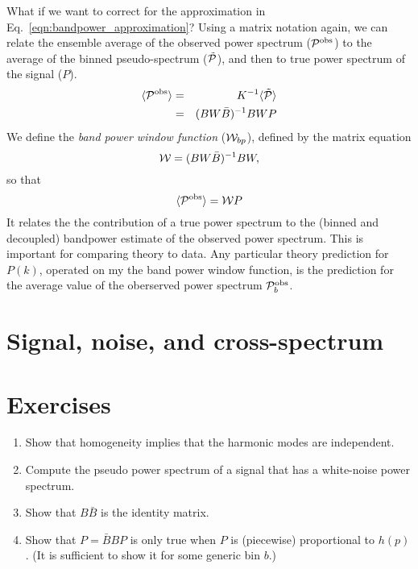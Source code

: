 What if we want to correct for the approximation in Eq.~\ref{eqn:bandpower_approximation}?  
Using a matrix notation again, we can relate the ensemble average of the observed power spectrum (${\cal P}^{\rm obs}$) to the average of the binned pseudo-spectrum ($\tilde {\cal P}$), and then to true power spectrum of the signal ($P$).
\begin{eqnarray}
  \langle {\cal P}^{\rm obs} \rangle &=& K^{-1} \langle \tilde {\cal P} \rangle \\
  &=&  (B W \bar B)^{-1} B W P \\
\end{eqnarray}
We define the \textit{band power window function} (${\cal W}_{bp}$), defined by the matrix equation
\begin{equation}
  {\cal W} = (B W \bar B)^{-1} B W,
\end{equation}
 so that
\begin{equation}
  \langle {\cal P}^{\rm obs} \rangle = {\cal W} P
\end{equation}
It relates the the contribution of a true power spectrum to the (binned and decoupled) bandpower estimate of the observed power spectrum.  This is important for comparing theory to data.  Any particular theory prediction for $P(k)$, operated on my the band power window function, is the prediction for the average value of the oberserved power spectrum ${\cal P}^{\rm obs}_b$.

\section{Signal, noise, and cross-spectrum}

\nocite{numerical_recipes,master,namaster}


\section*{Exercises}

\begin{enumerate}

\item Show that homogeneity implies that the harmonic modes are independent.

\item Compute the pseudo power spectrum of a signal that has a white-noise power spectrum.

\item Show that $B\bar B$ is the identity matrix.

\item Show that $P = \bar B B P$ is only true when $P$ is (piecewise) proportional to $h(p)$.  (It is sufficient to show it for some generic bin $b$.)
  
\end{enumerate}



